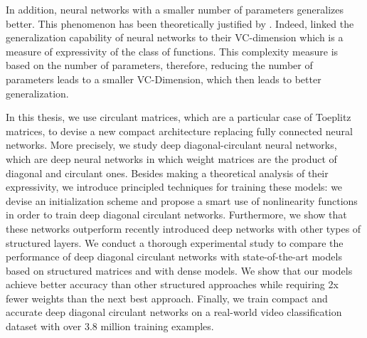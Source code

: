 

In addition, neural networks with a smaller number of parameters generalizes better. 
This phenomenon has been theoretically justified by \citet{vapnik1982estimation}.
Indeed, \citeauthor{vapnik1982estimation} linked the generalization capability of neural networks to their VC-dimension which is a measure of expressivity of the class of functions.
This complexity measure is based on the number of parameters, therefore, reducing the number of parameters leads to a smaller VC-Dimension, which then leads to better generalization.


In this thesis, we use circulant matrices, which are a particular case of Toeplitz matrices, to devise a new compact architecture replacing fully connected neural networks.
More precisely, we study deep diagonal-circulant neural networks, which are deep neural networks in which weight matrices are the product of diagonal and circulant ones.
Besides making a theoretical analysis of their expressivity, we introduce principled techniques for training these models: we devise an initialization scheme and propose a smart use of nonlinearity functions in order to train deep diagonal circulant networks.
Furthermore, we show that these networks outperform recently introduced deep networks with other types of structured layers.
We conduct a thorough experimental study to compare the performance of deep diagonal circulant networks with state-of-the-art models based on structured matrices and with dense models.
We show that our models achieve better accuracy than other structured approaches while requiring 2x fewer weights than the next best approach.
Finally, we train compact and accurate deep diagonal circulant networks on a real-world video classification dataset with over 3.8 million training examples. 





